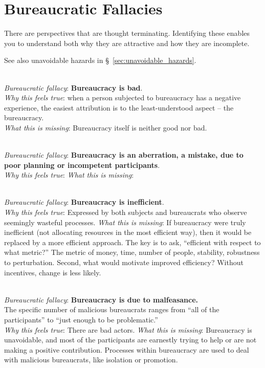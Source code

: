 \section{Bureaucratic Fallacies\label{sec:fallacies}}

There are perspectives that are \gls{thought terminating}. Identifying these enables you to understand both why they are attractive and how they are incomplete.

See also unavoidable hazards in \S~\ref{sec:unavoidable_hazards}.

\ \\

\textit{Bureaucratic fallacy}: \textbf{Bureaucracy is bad}. \\
\textit{Why this feels true}: when a person subjected to bureaucracy has a negative experience, the easiest attribution is to the least-understood aspect -- the bureaucracy.\\
\textit{What this is missing}: Bureaucracy itself is neither good nor bad. 

\ \\

\textit{Bureaucratic fallacy}: \textbf{Bureaucracy is an aberration, a mistake, due to poor planning or incompetent participants}. \\
\textit{Why this feels true}: 
\textit{What this is missing}: 

\ \\

\textit{Bureaucratic fallacy}: \textbf{Bureaucracy is inefficient}. \\
\textit{Why this feels true}: Expressed by both subjects and bureaucrats who observe seemingly wasteful processes.
\textit{What this is missing}: If bureaucracy were truly inefficient (not allocating resources in the most efficient way), then it would be replaced by a more efficient approach. The key is to ask, ``efficient with respect to what metric?'' The metric of money, time, number of people, stability, robustness to perturbation.  Second, what would motivate improved efficiency? Without incentives, change is less likely. 

\ \\

\textit{Bureaucratic fallacy}: \textbf{Bureaucracy is due to malfeasance.}\\
The specific number of malicious bureaucrats ranges from ``all of the participants'' to ``just enough to be problematic.'' \\
\textit{Why this feels true}: There are bad actors. 
\textit{What this is missing}: Bureaucracy is unavoidable, and most of the participants are earnestly trying to help or are not making a positive contribution. Processes within bureaucracy are used to deal with malicious bureaucrats, like isolation or promotion. 

